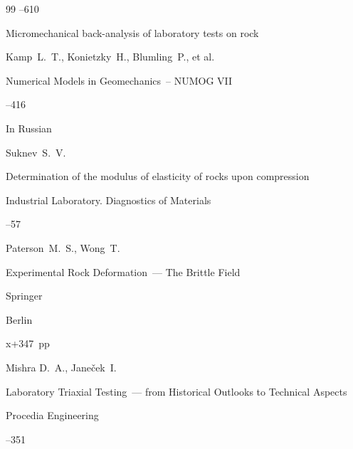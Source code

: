 \begin{thebibliography}{99}
--610






\paper Micromechanical back-analysis of laboratory tests on rock

\by Kamp~L.~T., Konietzky~H., Blumling~P., et al.

\inbook Numerical Models in Geomechanics~-- NUMOG VII   

--416   






\lang In Russian


\by Suknev~S.~V.

\paper Determination of the modulus of elasticity of rocks upon compression

\jour  Industrial Laboratory. Diagnostics of Materials




--57




\by Paterson~M.~S., Wong~T.

\book Experimental Rock Deformation~--- The Brittle Field

\publ Springer

\publaddr Berlin


\totalpages x+347~pp \nofrills





\by Mishra D.~A.,  Jane\v{c}ek~I.

\paper  Laboratory Triaxial Testing~--- from Historical Outlooks to Technical Aspects 

\jour  Procedia Engineering



--351


\end{thebibliography}
